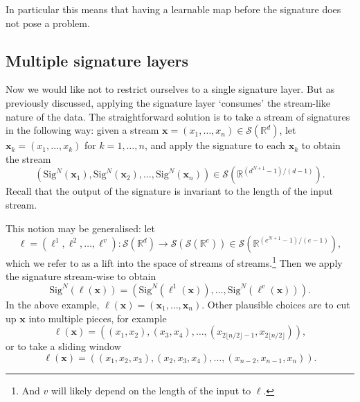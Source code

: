\documentclass{article}
\theoremstyle{plain}
\theoremstyle{definition}
\begin{document}
	In particular this means that having a learnable map before the signature does not pose a problem.
	
	\subsection{Multiple signature layers}	
	Now we would like not to restrict ourselves to a single signature layer. But as previously discussed, applying the signature layer `consumes' the stream-like nature of the data. The straightforward solution is to take a stream of signatures in the following way: given a stream $\mathbf x = (x_1, \ldots, x_n) \in \mathcal S(\mathbb R^d)$, let $\mathbf x_k = (x_1, \ldots, x_k)$ for $k=1, \ldots, n$, and apply the signature to each $\mathbf x_k$ to obtain the stream
	\begin{equation*}
	(\mathrm{Sig}^N(\mathbf x_1), \mathrm{Sig}^N(\mathbf x_2), \ldots, \mathrm{Sig}^N(\mathbf x_n)) \in \mathcal S(\mathbb R^{(d^{N + 1} - 1)/(d - 1)}).
	\end{equation*}
	Recall that the output of the signature is invariant to the length of the input stream.
	
	This notion may be generalised: let
	\begin{equation*}
	\ell = (\ell^1, \ell^2, \ldots, \ell^v) \colon \mathcal S(\mathbb R^d) \to \mathcal S(\mathcal S(\mathbb R^e)) \in \mathcal S(\mathbb R^{(e^{N + 1} - 1)/(e - 1)}),
	\end{equation*}
	which we refer to as a lift into the space of streams of streams.\footnote{And $v$ will likely depend on the length of the input to $\ell$.} Then we apply the signature stream-wise to obtain
	\begin{equation*}
	\mathrm{Sig}^N(\ell(\mathbf x)) = \left(\mathrm{Sig}^N(\ell^1(\mathbf x)), \ldots, \mathrm{Sig}^N(\ell^v(\mathbf x))\right).
	\end{equation*}
	In the above example, $\ell(\mathbf x) = (\mathbf x_1, \ldots, \mathbf x_n)$. Other plausible choices are to cut up $\mathbf x$ into multiple pieces, for example
	\begin{equation*}
	\ell(\mathbf x) = ((x_1, x_2), (x_3, x_4), \ldots, (x_{2\lfloor n/2 \rfloor - 1}, x_{2\lfloor n/2 \rfloor})),
	\end{equation*}
	or to take a sliding window
	\begin{equation*}
	\ell(\mathbf x) = ((x_1, x_2, x_3), (x_2, x_3, x_4), \ldots, (x_{n - 2}, x_{n - 1}, x_n)).
	\end{equation*}
	
\end{document}
